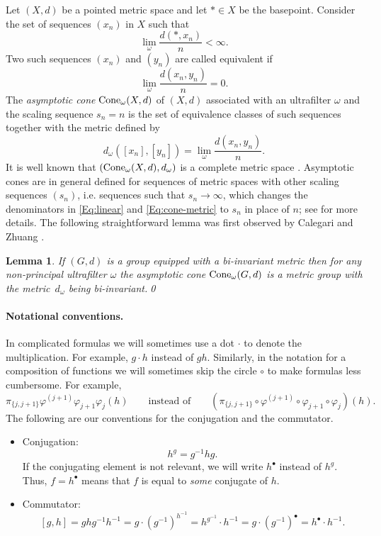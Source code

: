 \documentclass[12pt,reqno,a4paper]{article}
\newtheorem{lemma}[theorem]{Lemma}
\theoremstyle{definition}
\theoremstyle{remark}
\numberwithin{equation}{section}
\numberwithin{figure}{section}
\begin{document}
Let $(X,d)$ be a pointed metric space and let $*\in X$ be the basepoint.
Consider the set of sequences $(x_n)$ in $X$ such that 
\begin{equation}
\lim_{\omega} \frac{d(*,x_n)}{n} < \infty.
\label{Eq:linear}
\end{equation}
Two such sequences $(x_n)$ and $(y_n)$ are called equivalent if 
$$
\lim_{\omega} \frac{d(x_n,y_n)}{n}=0.
$$
The {\em asymptotic cone} ${\rm Cone}_{\omega}(X,d)$ of $(X,d)$ 
associated with an ultrafilter $\omega$ and the scaling sequence 
$s_n=n$
is the set of equivalence classes of such sequences together
with the metric defined by
\begin{equation}
d_{\omega}([x_n],[y_n]) = \lim_{\omega}\frac{d(x_n,y_n)}{n}.
\label{Eq:cone-metric}
\end{equation}
It is well known that $({\rm Cone}_{\omega}(X,d),d_{\omega})$ is a complete metric
space \cite[Proposition 7.44]{zbMATH06866242}. 
Asymptotic cones are in general defined for
sequences of metric spaces with other scaling sequences $(s_n)$, i.e. sequences such that $s_n \to \infty$, which 
changes the denominators in \eqref{Eq:linear} and \eqref{Eq:cone-metric} to $s_n$ in place of $n$;
see \cite[Section 7]{zbMATH06866242} for more details. The following straightforward
lemma was first observed by Calegari and Zhuang \cite{zbMATH06563655}.

\begin{lemma}\label{L:cone-group}
If $(G,d)$ is a group equipped with a bi-invariant metric then for any
non-principal ultrafilter $\omega$ the asymptotic cone ${\rm Cone}_{\omega}(G,d)$
is a metric group with the metric~$d_{\omega}$ being bi-invariant.\qed
\end{lemma}

\paragraph{Notational conventions.}\label{PA:notation}
In complicated formulas we will sometimes use a dot $\cdot$ to denote the multiplication.
For example, $g\cdot h$ instead of $gh$. Similarly, in the notation
for a composition of functions we will sometimes skip the circle $\circ$ to make
formulas less cumbersome. For example, 
$$
\pi_{\{j,j+1\}}\varphi^{(j+1)}\varphi_{j+1}\varphi_j(h)\qquad
\text{instead of}\qquad
\left(\pi_{\{j,j+1\}}\circ \varphi^{(j+1)}\circ \varphi_{j+1}\circ\varphi_j\right)(h).
$$
The following are our conventions
for the conjugation and the commutator.
\begin{itemize}
\item Conjugation:
\[
h^g = g^{-1}hg.
\]
If the conjugating element is not relevant, 
we will write $h^{\bullet}$ instead of $h^g$. 
Thus, $f=h^{\bullet}$ means
that $f$ is equal to {\em some} conjugate of $h$.

\item Commutator: 
\[
[g,h]= ghg^{-1}h^{-1} = g\cdot (g^{-1})^{h^{-1}} = h^{g^{-1}}\cdot h^{-1}
=g\cdot(g^{-1})^{\bullet}=h^{\bullet}\cdot h^{-1}.
\]
\end{itemize}
\end{document}

